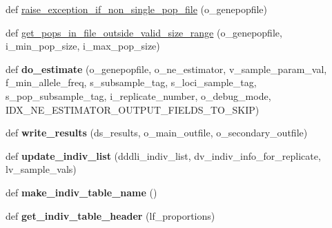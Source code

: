 \begin{DoxyCompactItemize}
\item 
def \hyperlink{namespacenegui_1_1pgdriveneestimator_ac98833013f11d6aa3544b0fc60951632}{raise\+\_\+exception\+\_\+if\+\_\+non\+\_\+single\+\_\+pop\+\_\+file} (o\+\_\+genepopfile)
\item 
def \hyperlink{namespacenegui_1_1pgdriveneestimator_ab546af99f06d3ec795da61f806ffafa9}{get\+\_\+pops\+\_\+in\+\_\+file\+\_\+outside\+\_\+valid\+\_\+size\+\_\+range} (o\+\_\+genepopfile, i\+\_\+min\+\_\+pop\+\_\+size, i\+\_\+max\+\_\+pop\+\_\+size)
\item 
def {\bfseries do\+\_\+estimate} (o\+\_\+genepopfile, o\+\_\+ne\+\_\+estimator, v\+\_\+sample\+\_\+param\+\_\+val, f\+\_\+min\+\_\+allele\+\_\+freq, s\+\_\+subsample\+\_\+tag, s\+\_\+loci\+\_\+sample\+\_\+tag, s\+\_\+pop\+\_\+subsample\+\_\+tag, i\+\_\+replicate\+\_\+number, o\+\_\+debug\+\_\+mode, I\+D\+X\+\_\+\+N\+E\+\_\+\+E\+S\+T\+I\+M\+A\+T\+O\+R\+\_\+\+O\+U\+T\+P\+U\+T\+\_\+\+F\+I\+E\+L\+D\+S\+\_\+\+T\+O\+\_\+\+S\+K\+IP)\hypertarget{namespacenegui_1_1pgdriveneestimator_a3716de25c72ca78325d0b5490593b14d}{}\label{namespacenegui_1_1pgdriveneestimator_a3716de25c72ca78325d0b5490593b14d}

\item 
def {\bfseries write\+\_\+results} (ds\+\_\+results, o\+\_\+main\+\_\+outfile, o\+\_\+secondary\+\_\+outfile)\hypertarget{namespacenegui_1_1pgdriveneestimator_a97bd4891f7343e405094bdf307c7ee89}{}\label{namespacenegui_1_1pgdriveneestimator_a97bd4891f7343e405094bdf307c7ee89}

\item 
def {\bfseries update\+\_\+indiv\+\_\+list} (dddli\+\_\+indiv\+\_\+list, dv\+\_\+indiv\+\_\+info\+\_\+for\+\_\+replicate, lv\+\_\+sample\+\_\+vals)\hypertarget{namespacenegui_1_1pgdriveneestimator_a087de69842dbbb60eaad4e2f692a06c7}{}\label{namespacenegui_1_1pgdriveneestimator_a087de69842dbbb60eaad4e2f692a06c7}

\item 
def {\bfseries make\+\_\+indiv\+\_\+table\+\_\+name} ()\hypertarget{namespacenegui_1_1pgdriveneestimator_aba42585f01bf9ed8468c043e7f05e56a}{}\label{namespacenegui_1_1pgdriveneestimator_aba42585f01bf9ed8468c043e7f05e56a}

\item 
def {\bfseries get\+\_\+indiv\+\_\+table\+\_\+header} (lf\+\_\+proportions)\hypertarget{namespacenegui_1_1pgdriveneestimator_a8ea31f316844b96fb9ba5d9985b16ecc}{}\label{namespacenegui_1_1pgdriveneestimator_a8ea31f316844b96fb9ba5d9985b16ecc}


\end{DoxyCompactItemize}
